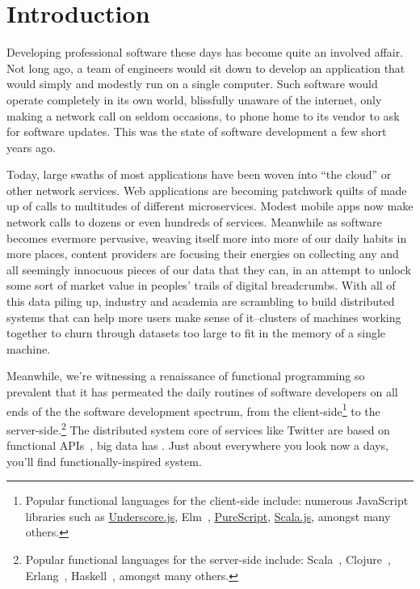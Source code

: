 \chapter{Introduction}

Developing professional software these days has become quite an involved affair.
Not long ago, a team of engineers would sit down to develop an application that
would simply and modestly run on a single computer. Such software would operate
completely in its own world, blissfully unaware of the internet, only making a
network call on seldom occasions, \eg to phone home to its vendor to ask for
software updates. This was the state of software development a few short years
ago.


Today, large swaths of most applications have been woven into ``the cloud'' or
other network services. Web applications are becoming patchwork quilts of made
up of calls to multitudes of different microservices. Modest mobile apps now
make network calls to dozens or even hundreds of services. Meanwhile as software
becomes evermore pervasive, weaving itself more into more of our daily habits in
more places, content providers are focusing their energies on collecting any and
all seemingly innocuous pieces of our data that they can, in an attempt to
unlock some sort of market value in peoples' trails of digital breadcrumbs. With
all of this data piling up, industry and academia are scrambling to build
distributed systems that can help more users make sense of it--clusters of
machines working together to churn through datasets too large to fit in the
memory of a single machine.

Meanwhile, we're witnessing a renaissance of functional programming so prevalent
that it has permeated the daily routines of software developers on all ends of
the the software development spectrum, from the client-side\footnote{Popular
functional languages for the client-side include: numerous JavaScript libraries
such as \href{http://underscorejs.org}{Underscore.js}, Elm~\cite{Elm},
\href{http://www.purescript.org/}{PureScript},
\href{http://www.scala-js.org/}{Scala.js}, amongst many others.} to the
server-side.\footnote{Popular functional languages for the server-side include:
Scala~\cite{Odersky10}, Clojure~\cite{Clojure}, Erlang~\cite{Erlang},
Haskell~\cite{Haskell}, amongst many others.} The distributed system core of
services like Twitter are based on functional APIs~\cite{Eriksen2013}, big data
has . Just about everywhere you look now a days, you'll find
functionally-inspired system.

